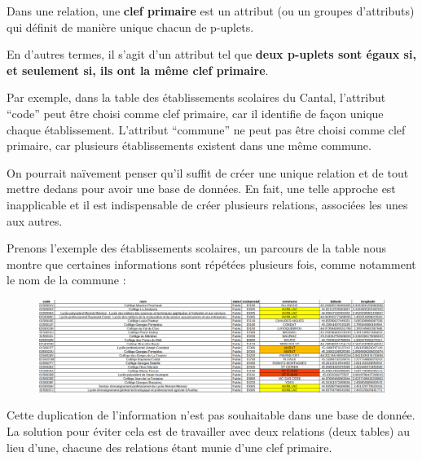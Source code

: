 \documentclass[
  a4paper,
  DIV=11,
  numbers=noendperiod]{scrartcl}
\begin{document}
\begin{tcolorbox}[enhanced jigsaw, bottomtitle=1mm, toptitle=1mm, colbacktitle=quarto-callout-tip-color!10!white, breakable, toprule=.15mm, bottomrule=.15mm, leftrule=.75mm, opacityback=0, rightrule=.15mm, coltitle=black, opacitybacktitle=0.6, title=\textcolor{quarto-callout-tip-color}{\faLightbulb}\hspace{0.5em}{Définition}, arc=.35mm, titlerule=0mm, left=2mm, colback=white]

Dans une relation, une \textbf{clef primaire} est un attribut (ou un
groupes d'attributs) qui définit de manière unique chacun de p-uplets.

\end{tcolorbox}

En d'autres termes, il s'agit d'un attribut tel que \textbf{deux
p-uplets sont égaux si, et seulement si, ils ont la même clef primaire}.

Par exemple, dans la table des établissements scolaires du Cantal,
l'attribut ``code'' peut être choisi comme clef primaire, car il
identifie de façon unique chaque établissement. L'attribut ``commune''
ne peut pas être choisi comme clef primaire, car plusieurs
établissements existent dans une même commune.

On pourrait naïvement penser qu'il suffit de créer une unique relation
et de tout mettre dedans pour avoir une base de données. En fait, une
telle approche est inapplicable et il est indispensable de créer
plusieurs relations, associées les unes aux autres.

Prenons l'exemple des établissements scolaires, un parcours de la table
nous montre que certaines informations sont répétées plusieurs fois,
comme notamment le nom de la commune :

\begin{figure}

{\centering \includegraphics{BDD6.png}

}

\end{figure}

Cette duplication de l'information n'est pas souhaitable dans une base
de donnée. La solution pour éviter cela est de travailler avec deux
relations (deux tables) au lieu d'une, chacune des relations étant munie
d'une clef primaire.
\end{document}
